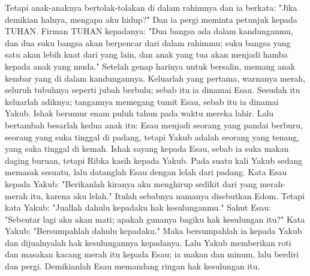 \begin{biblechapter}
\verse Tetapi anak-anaknya bertolak-tolakan di dalam rahimnya dan ia berkata: "Jika demikian halnya, mengapa aku hidup?" Dan ia pergi meminta petunjuk kepada TUHAN.
\verse Firman TUHAN kepadanya: "Dua bangsa ada dalam kandunganmu, dan dua suku bangsa akan berpencar dari dalam rahimmu; suku bangsa yang satu akan lebih kuat dari yang lain, dan anak yang tua akan menjadi hamba kepada anak yang muda."
\verse Setelah genap harinya untuk bersalin, memang anak kembar yang di dalam kandungannya.
\verse Keluarlah yang pertama, warnanya merah, seluruh tubuhnya seperti jubah berbulu; sebab itu ia dinamai Esau.
\verse Sesudah itu keluarlah adiknya; tangannya memegang tumit Esau, sebab itu ia dinamai Yakub. Ishak berumur enam puluh tahun pada waktu mereka lahir.
\verse Lalu bertambah besarlah kedua anak itu: Esau menjadi seorang yang pandai berburu, seorang yang suka tinggal di padang, tetapi Yakub adalah seorang yang tenang, yang suka tinggal di kemah.
\verse Ishak sayang kepada Esau, sebab ia suka makan daging buruan, tetapi Ribka kasih kepada Yakub.
\verse Pada suatu kali Yakub sedang memasak sesuatu, lalu datanglah Esau dengan lelah dari padang.
\verse Kata Esau kepada Yakub: "Berikanlah kiranya aku menghirup sedikit dari yang merah-merah itu, karena aku lelah." Itulah sebabnya namanya disebutkan Edom.
\verse Tetapi kata Yakub: "Juallah dahulu kepadaku hak kesulunganmu."
\verse Sahut Esau: "Sebentar lagi aku akan mati; apakah gunanya bagiku hak kesulungan itu?"
\verse Kata Yakub: "Bersumpahlah dahulu kepadaku." Maka bersumpahlah ia kepada Yakub dan dijualnyalah hak kesulungannya kepadanya.
\verse Lalu Yakub memberikan roti dan masakan kacang merah itu kepada Esau; ia makan dan minum, lalu berdiri dan pergi. Demikianlah Esau memandang ringan hak kesulungan itu.
\end{biblechapter}

